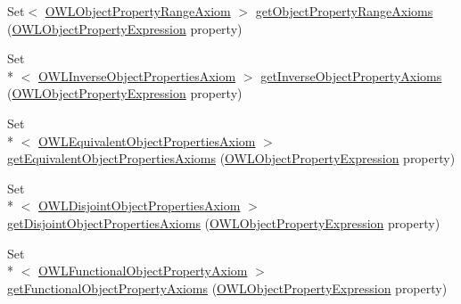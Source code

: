 \begin{DoxyCompactItemize}
\item 
Set$<$ \hyperlink{interfaceorg_1_1semanticweb_1_1owlapi_1_1model_1_1_o_w_l_object_property_range_axiom}{O\-W\-L\-Object\-Property\-Range\-Axiom} $>$ \hyperlink{interfaceorg_1_1semanticweb_1_1owlapi_1_1model_1_1_o_w_l_ontology_abbe81ac6c4d42cdff856d19bf51228f4}{get\-Object\-Property\-Range\-Axioms} (\hyperlink{interfaceorg_1_1semanticweb_1_1owlapi_1_1model_1_1_o_w_l_object_property_expression}{O\-W\-L\-Object\-Property\-Expression} property)
\item 
Set\\*
$<$ \hyperlink{interfaceorg_1_1semanticweb_1_1owlapi_1_1model_1_1_o_w_l_inverse_object_properties_axiom}{O\-W\-L\-Inverse\-Object\-Properties\-Axiom} $>$ \hyperlink{interfaceorg_1_1semanticweb_1_1owlapi_1_1model_1_1_o_w_l_ontology_a6ddda1acf1d46b328e8a44d0712927e1}{get\-Inverse\-Object\-Property\-Axioms} (\hyperlink{interfaceorg_1_1semanticweb_1_1owlapi_1_1model_1_1_o_w_l_object_property_expression}{O\-W\-L\-Object\-Property\-Expression} property)
\item 
Set\\*
$<$ \hyperlink{interfaceorg_1_1semanticweb_1_1owlapi_1_1model_1_1_o_w_l_equivalent_object_properties_axiom}{O\-W\-L\-Equivalent\-Object\-Properties\-Axiom} $>$ \hyperlink{interfaceorg_1_1semanticweb_1_1owlapi_1_1model_1_1_o_w_l_ontology_a9902a45bbd2b0a0e4200bd9e62874d05}{get\-Equivalent\-Object\-Properties\-Axioms} (\hyperlink{interfaceorg_1_1semanticweb_1_1owlapi_1_1model_1_1_o_w_l_object_property_expression}{O\-W\-L\-Object\-Property\-Expression} property)
\item 
Set\\*
$<$ \hyperlink{interfaceorg_1_1semanticweb_1_1owlapi_1_1model_1_1_o_w_l_disjoint_object_properties_axiom}{O\-W\-L\-Disjoint\-Object\-Properties\-Axiom} $>$ \hyperlink{interfaceorg_1_1semanticweb_1_1owlapi_1_1model_1_1_o_w_l_ontology_a4c5be31be9794b6f21dcf09711f1df04}{get\-Disjoint\-Object\-Properties\-Axioms} (\hyperlink{interfaceorg_1_1semanticweb_1_1owlapi_1_1model_1_1_o_w_l_object_property_expression}{O\-W\-L\-Object\-Property\-Expression} property)
\item 
Set\\*
$<$ \hyperlink{interfaceorg_1_1semanticweb_1_1owlapi_1_1model_1_1_o_w_l_functional_object_property_axiom}{O\-W\-L\-Functional\-Object\-Property\-Axiom} $>$ \hyperlink{interfaceorg_1_1semanticweb_1_1owlapi_1_1model_1_1_o_w_l_ontology_a85a03851fce9f65bc125c568bdec7854}{get\-Functional\-Object\-Property\-Axioms} (\hyperlink{interfaceorg_1_1semanticweb_1_1owlapi_1_1model_1_1_o_w_l_object_property_expression}{O\-W\-L\-Object\-Property\-Expression} property)

\end{DoxyCompactItemize}
